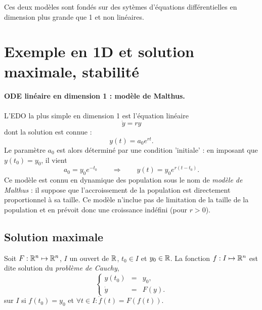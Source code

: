 Ces deux modèles sont fondés sur des sytèmes d'équations différentielles en dimension plus grande que 1 et non linéaires.

\section{Exemple en 1D et solution maximale, stabilité} \label{sec:EquaDiff-1DsolMaximale}

\paragraph*{ODE linéaire en dimension 1 : modèle de Malthus.}
L'EDO la plus simple en dimension 1 est l'équation linéaire
$$
\dot y = r y
$$
dont la solution est connue : 
$$
y(t) = a_0 e^{rt}.
$$
Le paramètre $a_0$ est alors déterminé par une condition 'initiale' : en imposant que $y(t_0) = y_0$, il vient
$$
a_0 = y_0 e^{-t_0} 
\qquad \Rightarrow \qquad
y(t) = y_0 e^{r(t-t_0)}.
$$
Ce modèle est connu en dynamique des population sous le nom de {\em modèle de Malthus} : il suppose que l'accroissement de la population est directement proportionnel à sa taille. Ce modèle n'inclue pas de limitation de la taille de la population et en prévoit donc une croissance indéfini (pour $r > 0$).


\subsection{Solution maximale} 

\begin{definition}
  Soit $F : \mathbb{R}^n \mapsto \mathbb{R}^n$, $I$ un ouvert de $\mathbb{R}$, $t_0 \in I$ et $y_0 \in \mathbb{R}$. La fonction $f : I \mapsto \mathbb{R}^n$ est dite solution du \emph{problème de Cauchy}, 
  $$
  \left\{\begin{array}{rcl}
          y(t_0) & = & y_0, \\
          \dot y & = & F(y).
        \end{array}\right.
  $$
  sur $I$ si $f(t_0) = y_0$ et $\forall t \in I: \dot f(t) = F(f(t))$.
\end{definition}

